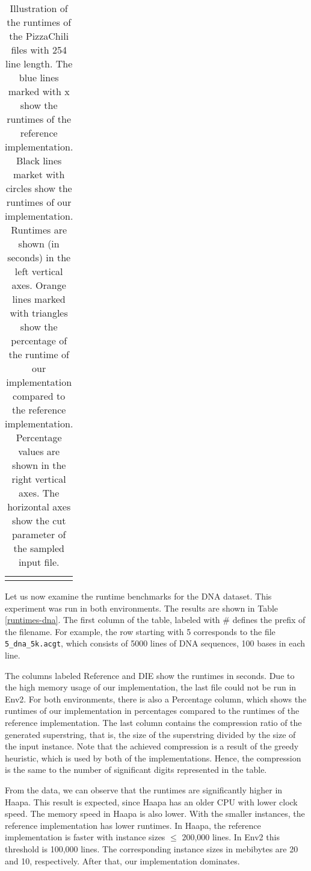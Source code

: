 \documentclass[english,twoside,censored,csm,algorithms-track-2020]{HYthesisML}
\theoremstyle{plain}
\theoremstyle{definition}
\begin{document}
\begin{table}[]
{\begin{tabular}{c@{\hskip 0.5in}c}
\hspace{0.6cm}
\begin{minipage}{.5\textwidth}
  \caption{Illustration of the runtimes of the PizzaChili files with 254 line length. The blue lines
    marked with x show the runtimes of the reference implementation. Black lines market with circles
    show the runtimes of our implementation. Runtimes are shown (in seconds) in the left vertical
    axes. Orange lines marked with triangles show the percentage of the runtime of our implementation
    compared to the reference implementation. Percentage values are shown in the right vertical axes.
    The horizontal axes show the cut parameter of the sampled input file.}
  \label{tbl-graphs}    
\end{minipage}

  \end{tabular}%
}
\end{table}



\vspace{-2.5cm}
Let us now examine the runtime benchmarks for the DNA dataset. This experiment was run in both
environments. The results are shown in Table \ref{runtimes-dna}. The first column of the table,
labeled with \# defines the prefix of the filename. For example, the row starting with 5 corresponds to the
file \texttt{5\_dna\_5k.acgt}, which consists of 5000 lines of DNA sequences, 100 bases in each
line.
  
The columns labeled Reference and DIE show the runtimes in seconds.
Due to the high memory usage of our implementation, the last file could not be run in Env2.
For both environments, there is
also a Percentage column, which shows the runtimes of our implementation in percentages compared
to the runtimes of the reference implementation. The last column contains the compression ratio of the
generated superstring, that is, the size of the superstring divided by the size of the input instance.
Note that the achieved compression is a result of the greedy heuristic, which is used by both
of the implementations. Hence, the compression is the same to the number of significant digits
represented in the table.

From the data, we can observe that the runtimes are significantly higher in Haapa. This result is
expected, since Haapa has an older CPU with lower clock speed. The memory speed in Haapa is
also lower. With the smaller instances, the reference implementation has lower runtimes.
In Haapa, the reference implementation is faster with instance sizes $\leq$ 200,000 lines.
In Env2 this threshold is 100,000 lines. The corresponding instance sizes in mebibytes are
20 and 10, respectively. After that, our implementation dominates.
\end{document}

